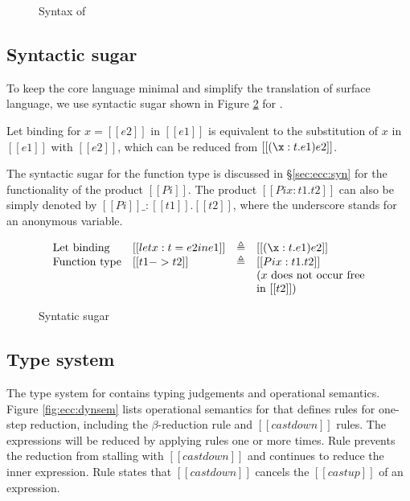 \begin{figure}[ht]
	\gram{\otte\ottinterrule
		\otts\ottinterrule
		\ottG\ottinterrule
		\ottv}
	\caption{Syntax of \expcc}
	\label{fig:ecc:syntax}
\end{figure}

\subsection{Syntactic sugar}

To keep the core language minimal and simplify the translation of surface language, we use syntactic sugar shown in Figure \ref{fig:ecc:sugar} for \expcc.

Let binding for $x=[[e2]]$ in $[[e1]]$ is equivalent to the substitution of $x$ in $[[e1]]$ with $[[e2]]$, which can be reduced from $[[(\x:t.e1)e2]]$.

The syntactic sugar for the function type is discussed in \S \ref{sec:ecc:syn} for the functionality of the product $[[Pi]]$. The product $[[Pi x:t1.t2]]$ can also be simply denoted by $[[Pi]] \_ : [[t1]] . [[t2]]$, where the underscore stands for an anonymous variable.

\begin{figure}[ht]
	\centering
	\[
	\begin{array}{llll}
	\text{Let binding} & [[let x : t = e2 in e1]] & \triangleq & [[(\x:t.e1)e2]] \\
	\text{Function type} & [[t1->t2]] & \triangleq & [[Pi x:t1.t2]]\\
	&&& \text{($x$ does not occur free}\\
	&&& \text{in $[[t2]]$)}
	\end{array}
	\]
	\caption{Syntatic sugar}
	\label{fig:ecc:sugar}
\end{figure}

\subsection{Type system}\label{sec:ecc:type}
The type system for \expcc contains typing judgements and operational semantics. Figure \ref{fig:ecc:dynsem} lists operational semantics for \expcc that defines rules for one-step reduction, including the $\beta$-reduction rule and $[[castdown]]$ rules. The expressions will be reduced by applying rules one or more times. Rule  prevents the reduction from stalling with $[[castdown]]$ and continues to reduce the inner expression. Rule  states that $[[castdown]]$ cancels the $[[castup]]$ of an expression.

